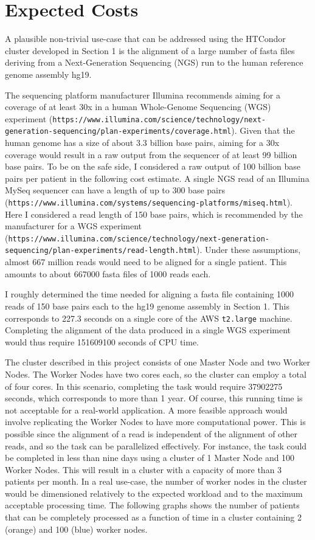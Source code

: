 \documentclass{article}
\begin{document}
\section{Expected Costs}
A plausible non-trivial use-case that can be addressed using the HTCondor cluster developed in Section 1 is the alignment of a large number of fasta files deriving from a Next-Generation Sequencing (NGS) run to the human reference genome assembly hg19.

The sequencing platform manufacturer Illumina recommends aiming for a coverage of at least 30x in a human Whole-Genome Sequencing (WGS) experiment (\texttt{https://www.illumina.com/science/technology/next-generation-sequencing/plan-experiments/coverage.html}).
Given that the human genome has a size of about 3.3 billion base pairs, aiming for a 30x coverage would result in a raw output from the sequencer of at least 99 billion base pairs.
To be on the safe side, I considered a raw output of 100 billion base pairs per patient in the following cost estimate.
A single NGS read of an Illumina MySeq sequencer can have a length of up to 300 base pairs (\texttt{https://www.illumina.com/systems/sequencing-platforms/miseq.html}). Here I considered a read length of 150 base pairs, which is recommended by the manufacturer for a WGS experiment (\texttt{https://www.illumina.com/science/technology/next-generation-sequencing/plan-experiments/read-length.html}).
Under these assumptions, almost 667 million reads would need to be aligned for a single patient.
This amounts to about 667000 fasta files of 1000 reads each.

I roughly determined the time needed for aligning a fasta file containing 1000 reads of 150 base pairs each to the hg19 genome assembly in Section 1.
This corresponds to 227.3 seconds on a single core of the AWS \texttt{t2.large} machine.
Completing the alignment of the data produced in a single WGS experiment would thus require 151609100 seconds of CPU time.

The cluster described in this project consists of one Master Node and two Worker Nodes.
The Worker Nodes have two cores each, so the cluster can employ a total of four cores.
In this scenario, completing the task would require 37902275 seconds, which corresponds to more than 1 year.
Of course, this running time is not acceptable for a real-world application.
A more feasible approach would involve replicating the Worker Nodes to have more computational power.
This is possible since the alignment of a read is independent of the alignment of other reads, and so the task can be parallelized effectively.
For instance, the task could be completed in less than nine days using a cluster of 1 Master Node and 100 Worker Nodes.
This will result in a cluster with a capacity of more than 3 patients per month.
In a real use-case, the number of worker nodes in the cluster would be dimensioned relatively to the expected workload and to the maximum acceptable processing time.
The following graphs shows the number of patients that can be completely processed as a function of time in a cluster containing 2 (orange) and 100 (blue) worker nodes.
\end{document}
